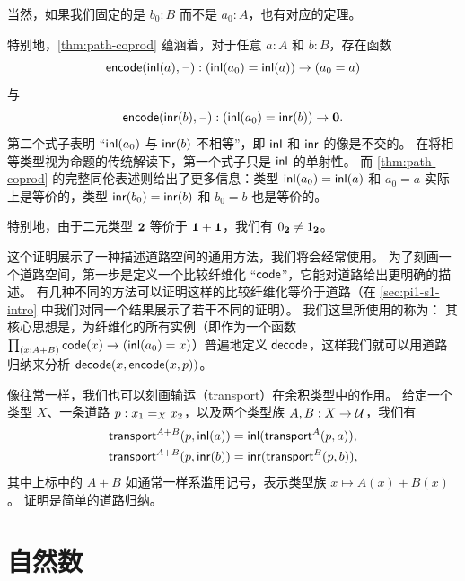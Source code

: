 \noindent
当然，如果我们固定的是 $b_0:B$ 而不是 $a_0:A$，也有对应的定理。

特别地，\cref{thm:path-coprod} 蕴涵着，对于任意 $a : A$ 和 $b : B$，存在函数
%
\[ \encode(\inl(a), {\blank}) : (\inl(a_0)=\inl(a)) \to (a_0=a)\]
%
与
%
\[ \encode(\inr(b), {\blank}) : (\inl(a_0)=\inr(b)) \to \emptyt. \]
%
第二个式子表明 ``$\inl(a_0)$ 与 $\inr(b)$ 不相等''，即 $\inl$ 和 $\inr$ 的像是不交的。
在将相等类型视为命题的传统解读下，第一个式子只是 $\inl$ 的单射性。
而 \cref{thm:path-coprod} 的完整同伦表述则给出了更多信息：类型 $\inl(a_0)=\inl(a)$ 和 $a_0=a$ 实际上是等价的，类型 $\inr(b_0)=\inr(b)$ 和 $b_0=b$ 也是等价的。

\begin{rmk}\label{rmk:true-neq-false}
  特别地，由于二元类型 $\bool$ 等价于 $\unit+\unit$，我们有 $\bfalse\neq\btrue$。
\end{rmk}

这个证明展示了一种描述道路空间的通用方法，我们将会经常使用。
为了刻画一个道路空间，第一步是定义一个比较纤维化 ``$\code$''，它能对道路给出更明确的描述。
有几种不同的方法可以证明这样的比较纤维化等价于道路（在 \cref{sec:pi1-s1-intro} 中我们对同一个结果展示了若干不同的证明）。
我们这里所使用的称为：
其核心思想是，为纤维化的所有实例（即作为一个函数 $\prd{x:A+B} \code(x) \to (\inl(a_0)=x)$）普遍地定义 $\decode$，这样我们就可以用道路归纳来分析 $\decode(x,\encode(x,p))$。

%
像往常一样，我们也可以刻画输运（transport）在余积类型中的作用。
给定一个类型 $X$、一条道路 $p:\id[X]{x_1}{x_2}$，以及两个类型族 $A,B:X\to\type$，我们有
\begin{align*}
  \transfib{A+B}{p}{\inl(a)} &= \inl (\transfib{A}{p}{a}),\\
  \transfib{A+B}{p}{\inr(b)} &= \inr (\transfib{B}{p}{b}),
\end{align*}
其中上标中的 $A+B$ 如通常一样系滥用记号，表示类型族 $x\mapsto A(x)+B(x)$。
证明是简单的道路归纳。

%
%

\section{自然数}
\label{sec:compute-nat}


